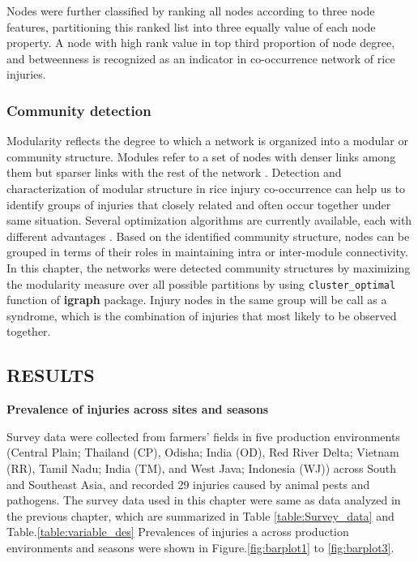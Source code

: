 Nodes were further classified by ranking all nodes according to three node features, partitioning this ranked list into three equally value of each node property. A node with high rank value in top third proportion of node degree, and betweenness is recognized as an indicator in co-occurrence network of rice injuries. 

\subsubsection{Community detection}

Modularity reflects the degree to which a network is organized into a modular or community structure. Modules refer to a set of nodes with denser links among them but sparser links with the rest of the network \citep{Newman_2006_Modularity}. Detection and characterization of modular structure in rice injury co-occurrence can help us to identify groups of injuries that closely related and often occur together under same situation. Several optimization algorithms are currently available, each with different advantages \citep{Brandes_2008_Modularity}. Based on the identified community structure, nodes can be grouped in terms of their roles in maintaining intra or inter-module connectivity. In this chapter, the networks were detected community structures by maximizing the modularity measure over all possible partitions by using \texttt{cluster\_optimal} function of \textbf{igraph} package. Injury nodes in the same group will be call as a syndrome, which is the combination of injuries that most likely to be observed together. 


\newpage
\subsection{RESULTS}


\textbf{Prevalence of injuries across sites and seasons}

Survey data were collected from farmers’ fields in five production environments (Central Plain; Thailand (CP), Odisha; India (OD), Red River Delta; Vietnam (RR), Tamil Nadu; India (TM), and West Java; Indonesia (WJ)) across South and Southeast Asia, and recorded 29 injuries caused by animal pests and pathogens.  The survey data used in this chapter were same as data analyzed in the previous chapter, which are summarized in Table \ref{table:Survey_data} and Table.\ref{table:variable_des} Prevalences of injuries a across production environments and seasons were shown in Figure.\ref{fig:barplot1} to \ref{fig:barplot3}. 

